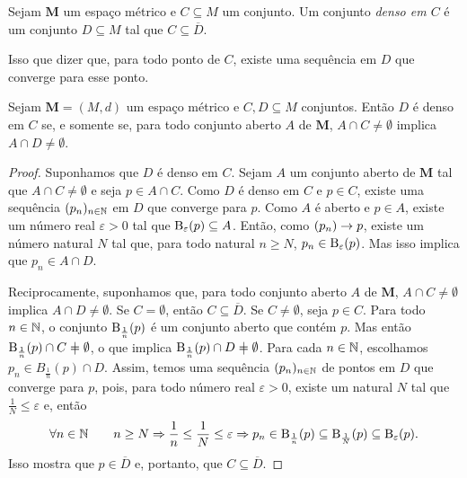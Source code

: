 \begin{definition}
	Sejam $\bm M$ um espaço métrico e $C \subseteq M$ um conjunto. Um conjunto \emph{denso em $C$} é um conjunto $D \subseteq M$ tal que $C \subseteq \overline D$.
\end{definition}

	Isso que dizer que, para todo ponto de $C$, existe uma sequência em $D$ que converge para esse ponto.
	
\begin{proposition}
	Sejam $\bm M = (M,d)$ um espaço métrico e $C,D \subseteq M$ conjuntos. Então $D$ é denso em $C$ se, e somente se, para todo conjunto aberto $A$ de $\bm M$, $A \cap C \neq \emptyset$ implica $A \cap D \neq \emptyset$.
\end{proposition}
\begin{proof}
	Suponhamos que $D$ é denso em $C$. Sejam $A$ um conjunto aberto de $\bm M$ tal que $A \cap C \neq \emptyset$ e seja $p \in A \cap C$. Como $D$ é denso em $C$ e $p \in C$, existe uma sequência $(p_n)_{n \in \mathbb{N}}$ em $D$ que converge para $p$. Como $A$ é aberto e $p \in A$, existe um número real $\varepsilon>0$ tal que $\mathrm{B}_\varepsilon(p) \subseteq A$. Então, como $(p_n) \rightarrow p$, existe um número natural $N$ tal que, para todo natural $n \geq N$, $p_n \in \mathrm{B}_\varepsilon(p)$. Mas isso implica que $p_n \in A \cap D$.
	
	Reciprocamente, suponhamos que, para todo conjunto aberto $A$ de $\bm M$, $A \cap C \neq \emptyset$ implica $A \cap D \neq \emptyset$. Se $C=\emptyset$, então $C \subseteq \overline D$. Se $C \neq \emptyset$, seja $p \in C$. Para todo $n \in \mathbb{N}$, o conjunto $\mathrm{B}_\frac{1}{n}(p)$ é um conjunto aberto que contém $p$. Mas então $\bola_\frac{1}{n}(p) \cap C \neq \emptyset$, o que implica $\bola_\frac{1}{n}(p) \cap D \neq \emptyset$. Para cada $n \in \mathbb{N}$, escolhamos $p_n \in B_\frac{1}{n}(p) \cap D$. Assim, temos uma sequência $(p_n)_{n \in \mathbb{N}}$ de pontos em $D$ que converge para $p$, pois, para todo número real $\varepsilon>0$, existe um natural $N$ tal que $\frac{1}{N} \leq \varepsilon$ e, então
	\begin{equation*}
	\forall n \in \mathbb{N} \qquad n \geq N \Rightarrow \frac{1}{n} \leq \frac{1}{N} \leq \varepsilon \Rightarrow p_n \in \mathrm{B}_\frac{1}{n}(p) \subseteq \mathrm{B}_\frac{1}{N}(p) \subseteq \mathrm{B}_\varepsilon(p).
	\end{equation*}
	Isso mostra que $p \in \overline D$ e, portanto, que $C \subseteq \overline D$.
\end{proof}

